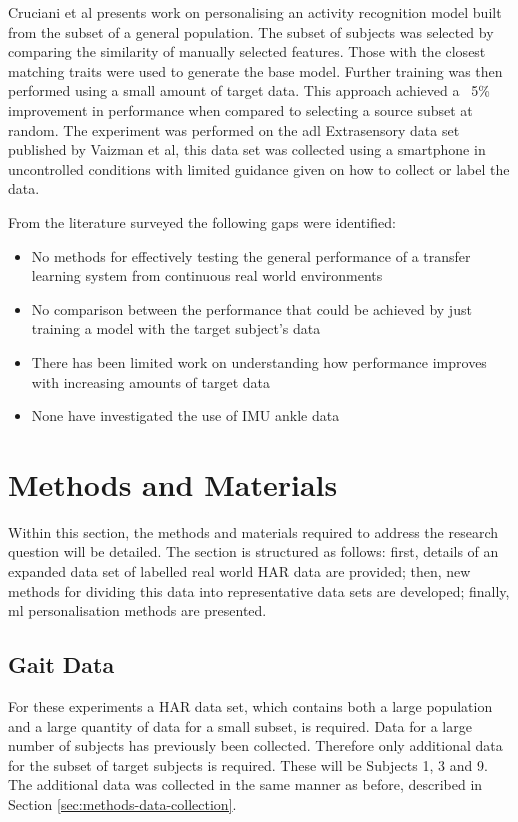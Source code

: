 Cruciani et al presents work on personalising an activity recognition model built from the subset of a general population. The subset of subjects was selected by comparing the similarity of manually selected features. Those with the closest matching traits were used to generate the base model. Further training was then performed using a small amount of target  data. This approach achieved a ~5\% improvement in performance when compared to selecting a source subset at random\cite{Cruciani2020}. The experiment was performed on the \acrshort{adl} Extrasensory data set published by Vaizman et al\cite{Vaizman2017}, this data set was collected using a smartphone in uncontrolled conditions with limited guidance given on how to collect or label the data.

From the literature surveyed the following gaps were identified:
\begin{itemize}
\item No methods for effectively testing the general performance of a transfer learning system from continuous real world environments
\item No comparison between the performance that could be achieved by just training a model with the target subject's data
\item There has been limited work on understanding how performance improves with increasing amounts of target data
\item None have investigated the use of IMU ankle data
\end{itemize}


\section{Methods and Materials}
\label{sec:personalistaion-methods}
Within this section, the methods and materials required to address the research question will be detailed. The section is structured as follows: first, details of an expanded data set of labelled real world HAR data are provided; then, new methods for dividing this data into representative data sets are developed; finally, \acrshort{ml} personalisation methods are presented.

\subsection{Gait Data}
For these experiments a HAR data set, which contains both a large population and a large quantity of data for a small subset, is required. Data for a large number of subjects has previously been collected. Therefore only additional data for the subset of target subjects is required. These will be Subjects 1, 3 and 9. The additional data was collected in the same manner as before, described in Section \ref{sec:methods-data-collection}.

